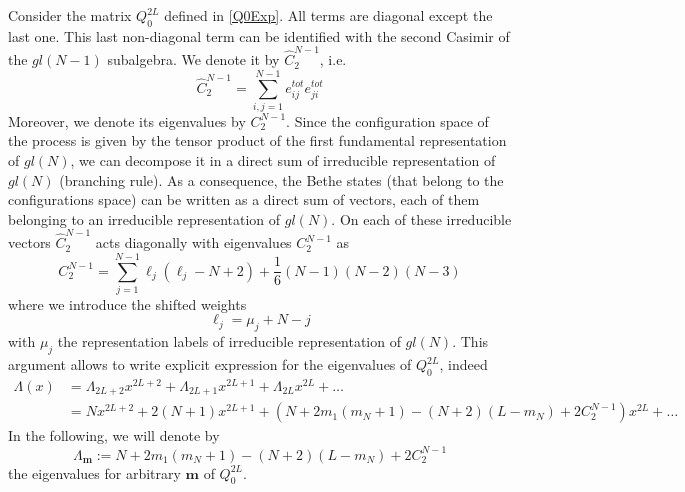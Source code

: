 \documentclass[10pt]{article}
\numberwithin{equation}{section}
\numberwithin{equation}{subsection}
\begin{document}
Consider the matrix $Q_{0}^{2L}$ defined in \eqref{Q0Exp}. All terms are diagonal except the last one. This last non-diagonal term can be identified with the second Casimir of the $gl(N-1)$ subalgebra. We denote it by $\hat{C}_{2}^{N-1}$, i.e.
\begin{equation}
\hat C_2^{N-1}= \sum_{i,j=1}^{N-1}e_{ij}^{tot}e_{ji}^{tot}
\end{equation} 
Moreover, we denote its eigenvalues by $C_{2}^{N-1}$. Since the configuration space of the process is given by the tensor product of the first fundamental representation of $gl(N)$, we can decompose it in a direct sum of irreducible representation of $gl(N)$ (branching rule). As a consequence, the Bethe states (that belong to the configurations space) can be written as a direct sum of vectors, each of them belonging to an irreducible representation of $gl(N)$. On each of these irreducible vectors $\hat{C}_{2}^{N-1}$ acts diagonally with eigenvalues $C_{2}^{N-1}$ as 
\begin{equation}
C_2^{N-1}=\sum_{j=1}^{N-1}\ell_j(\ell_j -N+2)+\frac{1}{6}(N-1)(N-2)(N-3)
\end{equation} 
 where we introduce the shifted weights
 \begin{equation}
 	\ell_{j}=\mu_{j}+N-j
 \end{equation}
with $\mu_{j}$ the representation labels of irreducible representation of $gl(N)$. This argument allows to write explicit expression for the eigenvalues of $Q_{0}^{2L}$, indeed 
\begin{equation}
\begin{split}
\Lambda(x)&= \Lambda_{2L+2} x^{2L+2}+ \Lambda_{2L+1} x^{2L+1}+ \Lambda_{2L}x^{2L}+\ldots
\\&=N x^{2L+2}+2(N+1) x^{2L+1}+ \left(N+2m_1(m_N+1)-(N+2)(L-m_N)+2C_{2}^{N-1}\right)x^{2L}+\ldots
\end{split}
\end{equation} 
In the following, we will denote by 
\begin{equation}
	\Lambda_{\bm{m}}:=N+2m_1(m_N+1)-(N+2)(L-m_{N})+2C_{2}^{N-1}
\end{equation}
the eigenvalues for arbitrary $\bm{m}$ of $Q_{0}^{2L}$. 
\begin{comment}
{\color{blue}
Thus the following difference is of order $2L$
\begin{equation}
\Lambda(x)-T_0(x)=x^{2L}\left(\Lambda_{2L}-Q_{2L}^0\right)+\ldots
\end{equation} 
In the following it will be useful to compute the quantity 
\begin{equation}
\lim_{x\to\infty}\frac{2x+N}{\Lambda(x)-T_0(x)}B_{i}(x)=\frac{2}{\Lambda_{2L}-Q_{2L}^0}B_i^{2L-1}
\end{equation} }
\end{comment}
\end{document}
